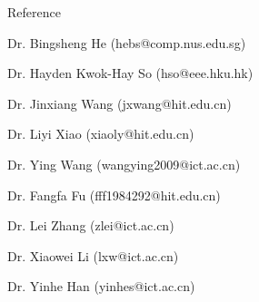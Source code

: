 \documentclass{resume} %
\begin{document}
\begin{rSection}{Reference}
\item Dr. Bingsheng He                              (hebs@comp.nus.edu.sg)
\item Dr. Hayden Kwok-Hay So                        (hso@eee.hku.hk)
\item Dr. Jinxiang Wang                             (jxwang@hit.edu.cn)
\item Dr. Liyi Xiao                                 (xiaoly@hit.edu.cn)
\item Dr. Ying Wang                                 (wangying2009@ict.ac.cn)
\item Dr. Fangfa Fu                                 (fff1984292@hit.edu.cn)
\item Dr. Lei Zhang                                 (zlei@ict.ac.cn)
\item Dr. Xiaowei Li                                (lxw@ict.ac.cn)
\item Dr. Yinhe Han                                 (yinhes@ict.ac.cn)
\end{rSection}
\end{document}
